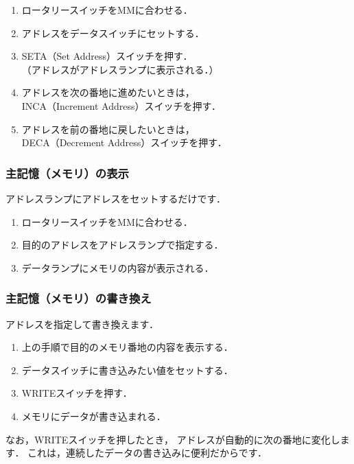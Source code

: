 \begin{enumerate}
\item ロータリースイッチをMMに合わせる．
\item アドレスをデータスイッチにセットする．
\item SETA（Set Address）スイッチを押す．\\
  （アドレスがアドレスランプに表示される．）
\item アドレスを次の番地に進めたいときは，\\
  INCA（Increment Address）スイッチを押す．
\item アドレスを前の番地に戻したいときは，\\
  DECA（Decrement Address）スイッチを押す．
\end{enumerate}

\subsubsection{主記憶（メモリ）の表示}
アドレスランプにアドレスをセットするだけです．

\begin{enumerate}
\item ロータリースイッチをMMに合わせる．
\item 目的のアドレスをアドレスランプで指定する．
\item データランプにメモリの内容が表示される．
\end{enumerate}

\subsubsection{主記憶（メモリ）の書き換え}
アドレスを指定して書き換えます．

\begin{enumerate}
\item 上の手順で目的のメモリ番地の内容を表示する．
\item データスイッチに書き込みたい値をセットする．
\item WRITEスイッチを押す．
\item メモリにデータが書き込まれる．
\end{enumerate}

なお，WRITEスイッチを押したとき，
アドレスが自動的に次の番地に変化します．
これは，連続したデータの書き込みに便利だからです．

